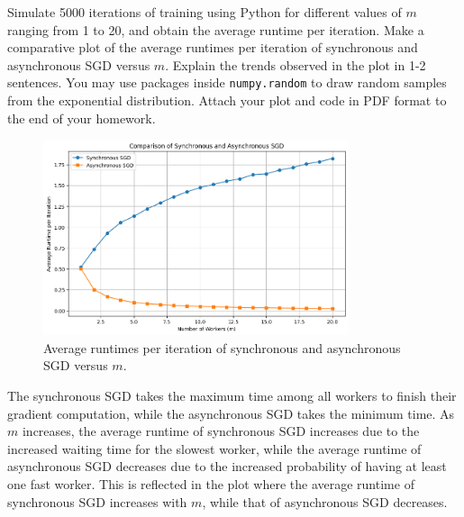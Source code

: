 \documentclass[a3paper,12pt]{extarticle} %
\begin{document}
\begin{enumerate}
Simulate 5000 iterations of training using Python for different values of $m$ ranging from 1 to 20, and obtain the average runtime per iteration. Make a comparative plot of the average runtimes per iteration of synchronous and asynchronous SGD versus $m$. Explain the trends observed in the plot in 1-2 sentences. You may use packages inside \texttt{numpy.random} to draw random samples from the exponential distribution. Attach your plot and code in PDF format to the end of your homework.
\begin{figure}[h]
\centering
\includegraphics[width=0.8\textwidth]{asynchronousVsynchronous.png}
\caption{Average runtimes per iteration of synchronous and asynchronous SGD versus $m$.}
\end{figure}

The synchronous SGD takes the maximum time among all workers to finish their gradient computation, while the asynchronous SGD takes the minimum time. As $m$ increases, the average runtime of synchronous SGD increases due to the increased waiting time for the slowest worker, while the average runtime of asynchronous SGD decreases due to the increased probability of having at least one fast worker. This is reflected in the plot where the average runtime of synchronous SGD increases with $m$, while that of asynchronous SGD decreases.



\end{enumerate}
\end{document}

